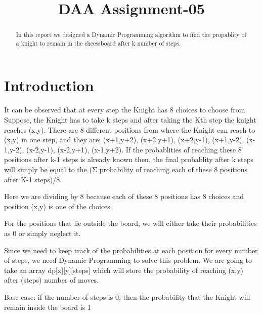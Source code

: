 \documentclass[conference]{IEEEtran}
\begin{document}
\title{DAA Assignment-05\\
}

\author{
\and
{}
\and
{}
}

\maketitle

\begin{abstract}
In this report we designed a Dynamic Programming algorithm to find the propablity of a knight to remain in the cheessboard after k number of steps.

\end{abstract}

\section{Introduction}
It can be observed that at every step the Knight has 8 choices to choose from. Suppose, the Knight has to take k steps and after taking the Kth step the knight reaches (x,y). There are 8 different positions from where the Knight can reach to (x,y) in one step, and they are: (x+1,y+2), (x+2,y+1), (x+2,y-1), (x+1,y-2), (x-1,y-2), (x-2,y-1), (x-2,y+1), (x-1,y+2).
If the probablities of reaching these 8 positions after k-1 steps is already known then, the final probablity after k steps will simply be equal to the (Σ probability of reaching each of these 8 positions after K-1 steps)/8.

Here we are dividing by 8 because each of these 8 positions has 8 choices and position (x,y) is one of the choices.

For the positions that lie outside the board, we will either take their probabilities as 0 or simply neglect it.

Since we need to keep track of the probabilities at each position for every number of steps, we need Dynamic Programming to solve this problem.
We are going to take an array dp[x][y][steps] which will store the probability of reaching (x,y) after (steps) number of moves.

Base case: if the number of steps is 0, then the probability that the Knight will remain inside the board is 1
\end{document}
